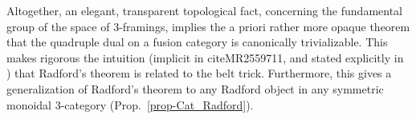 \documentclass{amsart}
\begin{document}
Altogether, an elegant, transparent topological fact, concerning the fundamental group of the space of $3$-framings, implies the a priori rather more opaque theorem that the quadruple dual on a fusion category is canonically trivializable. This makes rigorous the intuition (implicit in cite{MR2559711}, and stated explicitly in \cite{0901.3975}) that Radford's theorem is related to the belt trick.    Furthermore, this gives a generalization of Radford's theorem to any Radford object in any symmetric monoidal $3$-category (Prop.~\ref{prop-Cat_Radford}).







\end{document}
